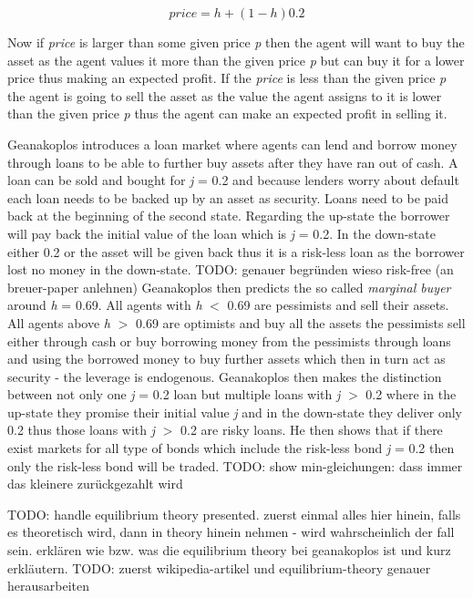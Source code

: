 \documentclass[../Bachelorarbeit.tex]{subfiles}
\begin{document}
\begin{equation}
price = h + (1 - h)0.2
\end{equation}

Now if \textit{price} is larger than some given price \textit{p} then the agent will want to buy the asset as the agent values it more than the given price \textit{p} but can buy it for a lower price thus making an expected profit. If the \textit{price} is less than the given price \textit{p} the agent is going to sell the asset as the value the agent assigns to it is lower than the given price \textit{p} thus the agent can make an expected profit in selling it.

\medskip
Geanakoplos introduces a loan market where agents can lend and borrow money through loans to be able to further buy assets after they have ran out of cash. A loan can be sold and bought for \textit{j} = 0.2 and because lenders worry about default each loan needs to be backed up by an asset as security. Loans need to be paid back at the beginning of the second state. Regarding the up-state the borrower will pay back the initial value of the loan which is \textit{j} = 0.2. In the down-state either 0.2 or the asset will be given back thus it is a risk-less loan as the borrower lost no money in the down-state. TODO: genauer begründen wieso risk-free (an breuer-paper anlehnen)
\linebreak
Geanakoplos then predicts the so called \textit{marginal buyer} around \textit{h} = 0.69. All agents with \textit{h} $<$ 0.69 are pessimists and sell their assets. All agents above \textit{h} $>$ 0.69 are optimists and buy all the assets the pessimists sell either through cash or buy borrowing money from the pessimists through loans and using the borrowed money to buy further assets which then in turn act as security - the leverage is endogenous.
\linebreak
Geanakoplos then makes the distinction between not only one \textit{j} = 0.2 loan but multiple loans with \textit{j} $>$ 0.2 where in the up-state they promise their initial value \textit{j} and in the down-state they deliver only 0.2 thus those loans with \textit{j} $>$ 0.2 are risky loans. He then shows that if there exist markets for all type of bonds which include the risk-less bond \textit{j} = 0.2 then only the risk-less bond will be traded. TODO: show min-gleichungen: dass immer das kleinere zurückgezahlt wird

\medskip

TODO: handle equilibrium theory presented. zuerst einmal alles hier hinein, falls es theoretisch wird, dann in theory hinein nehmen - wird wahrscheinlich der fall sein.
erklären wie bzw. was die equilibrium theory bei geanakoplos ist und kurz erkläutern.
TODO: zuerst wikipedia-artikel und equilibrium-theory genauer herausarbeiten
\end{document}
